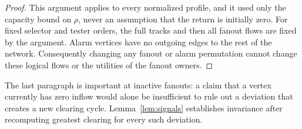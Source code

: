 \documentclass[11pt]{article}
\begin{document}
\begin{proof}
This argument applies to every normalized profile, and it used only the capacity bound on $\rho$, never an assumption that the return is initially zero. For fixed selector and tester orders, the full tracks and then all fanout flows are fixed by the argument. Alarm vertices have no outgoing edges to the rest of the network. Consequently changing any fanout or alarm permutation cannot change these logical flows or the utilities of the fanout owners.
\end{proof}

The last paragraph is important at inactive fanouts: a claim that a vertex currently has zero inflow would alone be insufficient to rule out a deviation that creates a new clearing cycle. Lemma~\ref{lem:signals} establishes invariance after recomputing greatest clearing for every such deviation.
\end{document}
